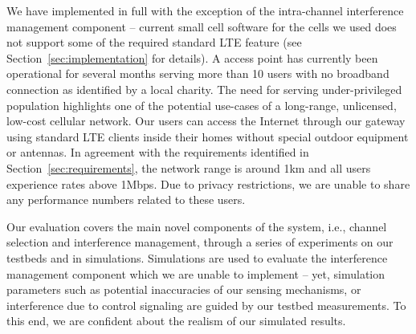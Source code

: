 We have implemented \cf in full with the exception of the intra-channel interference management component -- current small cell software for the cells we used does not support some of the required standard LTE feature (see Section~\ref{sec:implementation} for details). A \cf access point has currently been operational for several months serving more than 10 users with no broadband connection as identified by a local charity. The need for serving under-privileged population highlights one of the potential use-cases of a long-range, unlicensed, low-cost cellular network. Our users can access the Internet through our gateway using standard LTE clients inside their homes without special outdoor equipment or antennas. In agreement with the requirements identified in Section~\ref{sec:requirements}, the network range is around 1km and all users experience rates above 1Mbps. Due to privacy restrictions, we are unable to share any performance numbers related to these users. 

Our evaluation covers the main novel components of the system, i.e., channel selection and interference management, through a series of experiments on our testbeds and in simulations. Simulations are used to evaluate the interference management component which we are unable to implement -- yet, simulation parameters such as potential inaccuracies of our sensing mechanisms, or interference due to control signaling are guided by our testbed measurements. To this end, we are confident about the realism of our simulated results.









